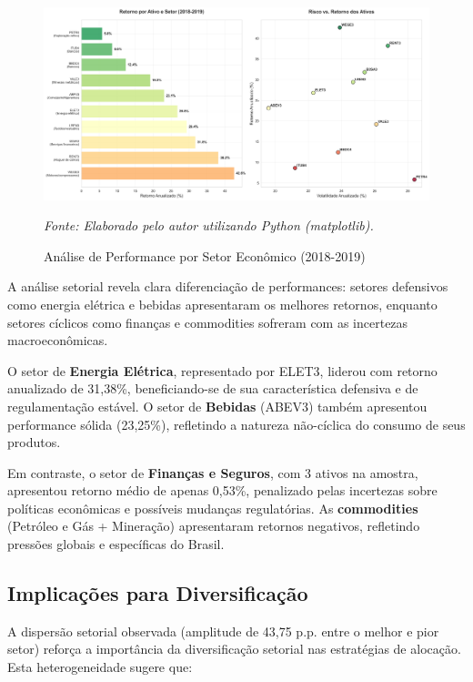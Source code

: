 

\begin{figure}[H]
\centering
\includegraphics[width=\textwidth]{images/sector_analysis.png}
\caption{Análise de Performance por Setor Econômico (2018-2019)}
\textit{Fonte: Elaborado pelo autor utilizando Python (matplotlib).}
\label{fig:sector_analysis}
\end{figure}

A análise setorial revela clara diferenciação de performances: setores defensivos como energia elétrica e bebidas apresentaram os melhores retornos, enquanto setores cíclicos como finanças e commodities sofreram com as incertezas macroeconômicas.

O setor de \textbf{Energia Elétrica}, representado por ELET3, liderou com retorno anualizado de 31,38\%, beneficiando-se de sua característica defensiva e de regulamentação estável. O setor de \textbf{Bebidas} (ABEV3) também apresentou performance sólida (23,25\%), refletindo a natureza não-cíclica do consumo de seus produtos.

Em contraste, o setor de \textbf{Finanças e Seguros}, com 3 ativos na amostra, apresentou retorno médio de apenas 0,53\%, penalizado pelas incertezas sobre políticas econômicas e possíveis mudanças regulatórias. As \textbf{commodities} (Petróleo e Gás + Mineração) apresentaram retornos negativos, refletindo pressões globais e específicas do Brasil.

\subsection{Implicações para Diversificação}

A dispersão setorial observada (amplitude de 43,75 p.p. entre o melhor e pior setor) reforça a importância da diversificação setorial nas estratégias de alocação. Esta heterogeneidade sugere que:

